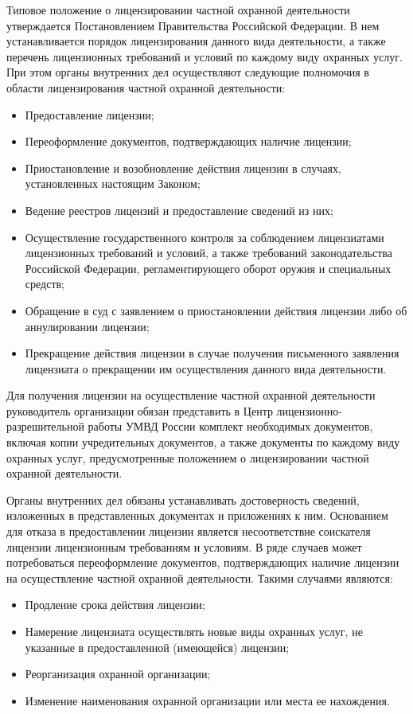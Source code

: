 \documentclass[a4paper,12pt,fleqn]{article} %
\begin{document}
Типовое положение о лицензировании частной охранной деятельности утверждается Постановлением Правительства Российской Федерации. В нем устанавливается порядок лицензирования данного вида деятельности, а также перечень лицензионных требований и условий по каждому виду охранных услуг. При этом органы внутренних дел осуществляют следующие полномочия в области лицензирования частной охранной деятельности:

\begin{itemize}
	\item Предоставление лицензии;
	\item Переоформление документов, подтверждающих наличие лицензии;
	\item Приостановление и возобновление действия лицензии в случаях, установленных настоящим Законом;
	\item Ведение реестров лицензий и предоставление сведений из них;
	\item Осуществление государственного контроля за соблюдением лицензиатами лицензионных требований и условий, а также требований законодательства Российской Федерации, регламентирующего оборот оружия и специальных средств;
	\item Обращение в суд с заявлением о приостановлении действия лицензии либо об аннулировании лицензии;
	\item Прекращение действия лицензии в случае получения письменного заявления лицензиата о прекращении им осуществления данного вида деятельности.
\end{itemize}

Для получения лицензии на осуществление частной охранной деятельности руководитель организации обязан представить в Центр лицензионно-разрешительной работы УМВД России комплект необходимых документов, включая копии учредительных документов, а также документы по каждому виду охранных услуг, предусмотренные положением о лицензировании частной охранной деятельности.

Органы внутренних дел обязаны устанавливать достоверность сведений, изложенных в представленных документах и приложениях к ним. Основанием для отказа в предоставлении лицензии является несоответствие соискателя лицензии лицензионным требованиям и условиям. В ряде случаев может потребоваться переоформление документов, подтверждающих наличие лицензии на осуществление частной охранной деятельности. Такими случаями являются:

\begin{itemize}
	\item Продление срока действия лицензии;
	\item Намерение лицензиата осуществлять новые виды охранных услуг, не указанные в предоставленной (имеющейся) лицензии;
	\item Реорганизация охранной организации;
	\item Изменение наименования охранной организации или места ее нахождения.
\end{itemize}
\end{document}

